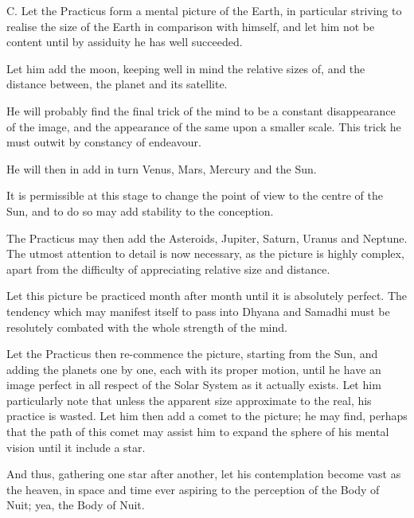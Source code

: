 \begin{quoting}

C. Let the Practicus form a mental picture of the Earth, in particular striving to realise the size of the Earth in comparison with himself, and let him not be content until by assiduity he has well succeeded.

Let him add the moon, keeping well in mind the relative sizes of, and the distance between, the planet and its satellite.

He will probably find the final trick of the mind to be a constant disappearance of the image, and the appearance of the same upon a smaller scale. This trick he must outwit by constancy of endeavour.

He will then in add in turn Venus, Mars, Mercury and the Sun.

It is permissible at this stage to change the point of view to the centre of the Sun, and to do so may add stability to the conception.

The Practicus may then add the Asteroids, Jupiter, Saturn, Uranus and Neptune. The utmost attention to detail is now necessary, as the picture is highly complex, apart from the difficulty of appreciating relative size and distance.

Let this picture be practiced month after month until it is absolutely perfect. The tendency which may manifest itself to pass into Dhyana and Samadhi must be resolutely combated with the whole strength of the mind.

Let the Practicus then re-commence the picture, starting from the Sun, and adding the planets one by one, each with its proper motion, until he have an image perfect in all respect of the Solar System as it actually exists. Let him particularly note that unless the apparent size approximate to the real, his practice is wasted. Let him then add a comet to the picture; he may find, perhaps that the path of this comet may assist him to expand the sphere of his mental vision until it include a star.

And thus, gathering one star after another, let his contemplation become vast as the heaven, in space and time ever aspiring to the perception of the Body of Nuit; yea, the Body of Nuit.
\end{quoting}
